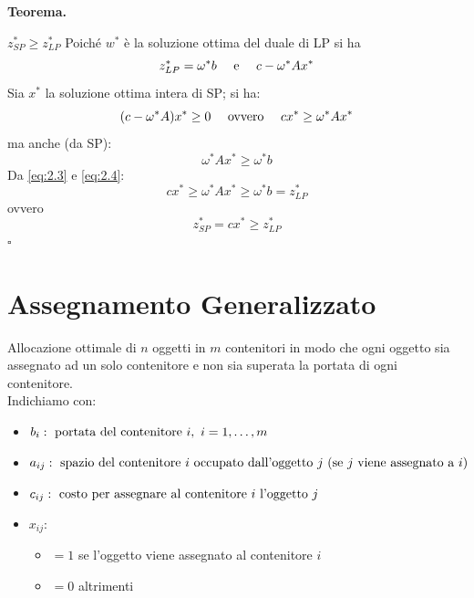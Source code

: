 \textbf{Teorema.}

$z_{SP}^{*}\ge z_{LP}^{*}$
Poiché $w^{*}$ è la soluzione ottima del duale di LP si ha
\begin{equation*}
	z_{LP}^{*}=\omega^{*}b\ \ \ \textnormal{ e }\ \ \ c-\omega^{*}Ax^{*}
\end{equation*}
Sia $x^{*}$ la soluzione ottima intera di SP; si ha:
\begin{equation}
	\label{eq:2.3}
	(c-\omega^{*}A)x^{*}\ge 0\ \ \ \textnormal{ ovvero }\ \ \ cx^{*}\ge \omega^{*}Ax^{*} 
\end{equation}
ma anche (da SP):
\begin{equation}
	\label{eq:2.4}
	\omega^{*}Ax^{*}\ge\omega^{*}b
\end{equation}
Da \ref{eq:2.3} e \ref{eq:2.4}:
\begin{equation*}
	cx^{*}\ge \omega^{*}Ax^{*}\ge\omega^{*}b=z^{*}_{LP}
\end{equation*}
ovvero
\begin{equation*}
	z^{*}_{SP}=cx^{*}\ge z_{LP}^{*}
\end{equation*}
$\square$

\section{Assegnamento Generalizzato}
Allocazione ottimale di $n$ oggetti in $m$ contenitori in modo che ogni oggetto sia assegnato ad un solo contenitore e non sia superata la portata di ogni contenitore.\\
Indichiamo con:
\begin{itemize}
	\item[] $b_{i}: \textnormal{ portata del contenitore }i,\ i=1,\dots,m$
	\item[] $a_{ij}: \textnormal{ spazio del contenitore $i$ occupato dall'oggetto $j$ (se $j$ viene assegnato a $i$)}$
	\item[] $c_{ij}: \textnormal{ costo per assegnare al contenitore $i$ l'oggetto $j$}$
	\item[] $x_{ij}$:
	\begin{itemize}
		\item[] $=1$ se l'oggetto viene assegnato al contenitore $i$
		\item[] $=0$ altrimenti
	\end{itemize}
\end{itemize}

